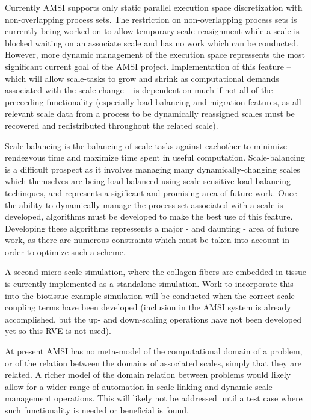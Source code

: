 \label{future-work}
Currently AMSI supports only static parallel execution space discretization with non-overlapping process sets. The restriction on non-overlapping process sets is currently being worked on to allow temporary scale-reasignment while a scale is blocked waiting on an associate scale and has no work which can be conducted. However, more dynamic management of the execution space repressents the most significant current goal of the AMSI project. Implementation of this feature -- which will allow scale-tasks to grow and shrink as computational demands associated with the scale change -- is dependent on much if not all of the preceeding functionality (especially load balancing and migration features, as all relevant scale data from a process to be dynamically reassigned scales must be recovered and redistributed throughout the related scale).

Scale-balancing is the balancing of scale-tasks against eachother to minimize rendezvous time and maximize time spent in useful computation. Scale-balancing is a difficult prospect as it involves managing many dynamically-changing scales which themselves are being load-balanced using scale-sensitive load-balancing techinques, and represents a sigificant and promising area of future work. Once the ability to dynamically manage the process set associated with a scale is developed, algorithms must be developed to make the best use of this feature. Developing these algorithms repressents a major - and daunting - area of future work, as there are numerous constraints which must be taken into account in order to optimize such a scheme.

A second micro-scale simulation, where the collagen fibers are embedded in tissue is currently implemented as a standalone simulation. Work to incorporate this into the biotissue example simulation will be conducted when the correct scale-coupling terms have been developed (inclusion in the AMSI system is already accomplished, but the up- and down-scaling operations have not been developed yet so this RVE is not used). \cite{lake2012mechanics} \cite{zhang2013cross} \cite{zhang2013coupled}

At present AMSI has no meta-model of the computational domain of a problem, or of the relation between the domains of associated scales, simply that they are related. A richer model of the domain relation between problems would likely allow for a wider range of automation in scale-linking and dynamic scale management operations. This will likely not be addressed until a test case where such functionality is needed or beneficial is found.

